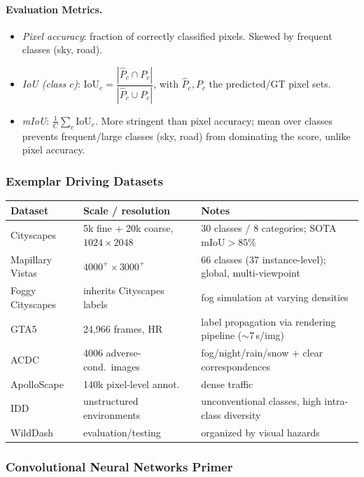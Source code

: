 \documentclass{article}
\begin{document}
\paragraph{Evaluation Metrics.}
\begin{itemize}
    \item \textit{Pixel accuracy}: fraction of correctly classified pixels. Skewed by frequent classes (sky, road).
    \item \textit{IoU (class $c$)}: $\mathrm{IoU}_c = \dfrac{|\hat{P}_c \cap P_c|}{|\hat{P}_c \cup P_c|}$, with $\hat{P}_c, P_c$ the predicted/GT pixel sets.
    \item \textit{mIoU}: $\frac{1}{C}\sum_c \mathrm{IoU}_c$. More stringent than pixel accuracy; mean over classes prevents frequent/large classes (sky, road) from dominating the score, unlike pixel accuracy.
\end{itemize}

\subsubsection{Exemplar Driving Datasets}
\begin{center}
\begin{tabular}{l|l|l}
    \textbf{Dataset} & \textbf{Scale / resolution} & \textbf{Notes} \\ \hline
    Cityscapes & 5k fine + 20k coarse, $1024\!\times\!2048$ & 30 classes / 8 categories; SOTA $\mathrm{mIoU} > 85\%$ \\
    Mapillary Vistas & $4000^+\!\times\!3000^+$ & 66 classes (37 instance-level); global, multi-viewpoint \\
    Foggy Cityscapes & inherits Cityscapes labels & fog simulation at varying densities \\
    GTA5 & 24{,}966 frames, HR & label propagation via rendering pipeline ($\sim$7\,s/img) \\
    ACDC & 4006 adverse-cond.\ images & fog/night/rain/snow + clear correspondences \\
    ApolloScape & 140k pixel-level annot. & dense traffic \\
    IDD & unstructured environments & unconventional classes, high intra-class diversity \\
    WildDash & evaluation/testing & organized by visual hazards \\
\end{tabular}
\end{center}

\subsubsection{Convolutional Neural Networks Primer}
\end{document}
